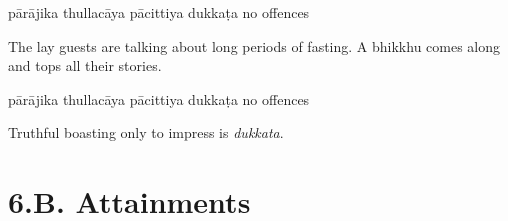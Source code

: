 \begin{exam}{\autoExamName}
\begin{problem*}
\begin{parts}
  \bigskip

  \begin{answers}{5}
    \bChoices
     pārājika\eAns
     thullacāya\eAns
     pācittiya\eAns
     dukkaṭa\eAns
     no offences\eAns
    \eChoices
  \end{answers}

  \bigskip

\item The lay guests are talking about long periods of fasting. A bhikkhu comes
  along and tops all their stories.

  \bigskip

  \begin{answers}{5}
    \bChoices
     pārājika\eAns
     thullacāya\eAns
     pācittiya\eAns
     dukkaṭa\eAns
     no offences\eAns
    \eChoices
  \end{answers}

  \begin{solution}
    Truthful boasting only to impress is \emph{dukkata}.
  \end{solution}

\end{parts}

\end{problem*}

\end{exam}

\chapter{6.B. Attainments}
\renewcommand*{\theChapterTitle}{6.B. Attainments}
